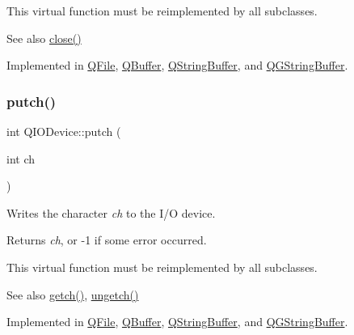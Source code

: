 This virtual function must be reimplemented by all subclasses.

\begin{DoxySeeAlso}{See also}
\mbox{\hyperlink{class_q_i_o_device_a01a9ddac5d964b5b6a1f10005bf28a4f}{close()}} 
\end{DoxySeeAlso}


Implemented in \mbox{\hyperlink{class_q_file_af10aeafc303904f98b74be9752d2aa43}{Q\+File}}, \mbox{\hyperlink{class_q_buffer_aa3ceff2217a13a570e0dcec157b23b18}{Q\+Buffer}}, \mbox{\hyperlink{class_q_string_buffer_a593d2870764f6888dd1aabea55304a46}{Q\+String\+Buffer}}, and \mbox{\hyperlink{class_q_g_string_buffer_afcecb219691daf1fb5f18f7324fc52b7}{Q\+G\+String\+Buffer}}.

\mbox{\label{class_q_i_o_device_a5de5c1c1cba7ca36ba93289e30cd3029}} 
\subsubsection{\texorpdfstring{putch()}{putch()}}
{\footnotesize\ttfamily int Q\+I\+O\+Device\+::putch (\begin{DoxyParamCaption}\item[{int}]{ch }\end{DoxyParamCaption})\hspace{0.3cm}{\ttfamily [pure virtual]}}

Writes the character {\itshape ch} to the I/O device.

Returns {\itshape ch}, or -\/1 if some error occurred.

This virtual function must be reimplemented by all subclasses.

\begin{DoxySeeAlso}{See also}
\mbox{\hyperlink{class_q_i_o_device_a7cef61d66023f9cda6b0912082bd19fc}{getch()}}, \mbox{\hyperlink{class_q_i_o_device_aae3d67422103e8fc0411297b1d62c29a}{ungetch()}} 
\end{DoxySeeAlso}


Implemented in \mbox{\hyperlink{class_q_file_af331c4e27024f12383958e65c6a828a3}{Q\+File}}, \mbox{\hyperlink{class_q_buffer_aa05ca49f73284ac1fa2b01ffb3be2874}{Q\+Buffer}}, \mbox{\hyperlink{class_q_string_buffer_ac95cff6e837ae523527b9d78cb6a4074}{Q\+String\+Buffer}}, and \mbox{\hyperlink{class_q_g_string_buffer_ae2265be83385ba58ff0e47880563bbb5}{Q\+G\+String\+Buffer}}.


